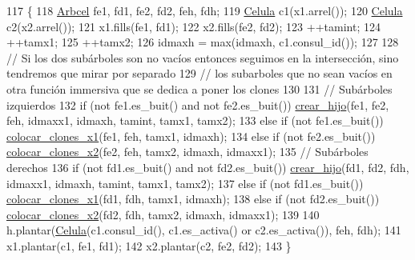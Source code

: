 \begin{DoxyCode}
117                                                                                                            
               \{
118     \hyperlink{class_organismo_a6d28459b85f211994ba446ba304fa141}{Arbcel} fe1, fd1, fe2, fd2, feh, fdh;
119     \hyperlink{class_celula}{Celula} c1(x1.arrel());
120     \hyperlink{class_celula}{Celula} c2(x2.arrel());
121     x1.fills(fe1, fd1);
122     x2.fills(fe2, fd2);
123     ++tamint;
124     ++tamx1;
125     ++tamx2;
126     idmaxh = max(idmaxh, c1.consul\_id());
127 
128     \textcolor{comment}{// Si los dos subárboles son no vacíos entonces seguimos en la intersección, sino tendremos que mirar
       por separado}
129     \textcolor{comment}{// los subarboles que no sean vacíos en otra función immersiva que se dedica a poner los clones}
130 
131     \textcolor{comment}{// Subárboles izquierdos}
132     \textcolor{keywordflow}{if} (not fe1.es\_buit() and not fe2.es\_buit()) \hyperlink{class_organismo_a65395a14684f31fa2dadba6a3e037ad5}{crear\_hijo}(fe1, fe2, feh, idmaxx1, idmaxh, 
      tamint, tamx1, tamx2);
133     \textcolor{keywordflow}{else} \textcolor{keywordflow}{if} (not fe1.es\_buit()) \hyperlink{class_organismo_ae702339f0378d08af4f30729a4f2307c}{colocar\_clones\_x1}(fe1, feh, tamx1, idmaxh);
134     \textcolor{keywordflow}{else} \textcolor{keywordflow}{if} (not fe2.es\_buit()) \hyperlink{class_organismo_a2614d55b5ce001c216fc24c2eed9bfef}{colocar\_clones\_x2}(fe2, feh, tamx2, idmaxh, idmaxx1);
135     \textcolor{comment}{// Subárboles derechos}
136     \textcolor{keywordflow}{if} (not fd1.es\_buit() and not fd2.es\_buit()) \hyperlink{class_organismo_a65395a14684f31fa2dadba6a3e037ad5}{crear\_hijo}(fd1, fd2, fdh, idmaxx1, idmaxh, 
      tamint, tamx1, tamx2);
137     \textcolor{keywordflow}{else} \textcolor{keywordflow}{if} (not fd1.es\_buit()) \hyperlink{class_organismo_ae702339f0378d08af4f30729a4f2307c}{colocar\_clones\_x1}(fd1, fdh, tamx1, idmaxh);
138     \textcolor{keywordflow}{else} \textcolor{keywordflow}{if} (not fd2.es\_buit()) \hyperlink{class_organismo_a2614d55b5ce001c216fc24c2eed9bfef}{colocar\_clones\_x2}(fd2, fdh, tamx2, idmaxh, idmaxx1);
139 
140     h.plantar(\hyperlink{class_celula}{Celula}(c1.consul\_id(), c1.es\_activa() or c2.es\_activa()), feh, fdh);
141     x1.plantar(c1, fe1, fd1);
142     x2.plantar(c2, fe2, fd2);
143 \}
\end{DoxyCode}
